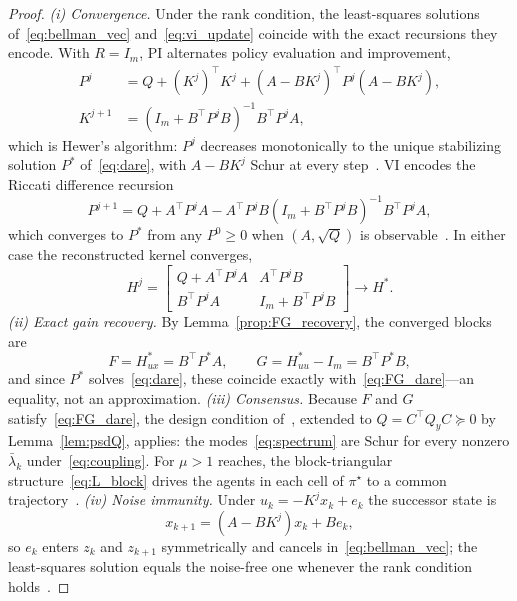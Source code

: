 \documentclass[final,5p,times]{elsarticle}
\theoremstyle{plain}
\theoremstyle{definition}
\theoremstyle{remark}
\begin{document}
\begin{proof}
\emph{(i) Convergence.} Under the rank condition, the least-squares solutions of~\eqref{eq:bellman_vec} and~\eqref{eq:vi_update} coincide with the exact recursions they encode. With $R = I_m$, PI alternates policy evaluation and improvement,
\begin{align}
P^j &= Q + (K^j)^\top K^j + (A - BK^j)^\top P^j (A - BK^j), \label{eq:pi_eval}\\
K^{j+1} &= (I_m + B^\top P^j B)^{-1} B^\top P^j A, \label{eq:pi_improve}
\end{align}
which is Hewer's algorithm: $P^j$ decreases monotonically to the unique stabilizing solution $P^*$ of~\eqref{eq:dare}, with $A - BK^j$ Schur at every step~\cite{hewer1971}. VI encodes the Riccati difference recursion
\begin{equation}
P^{j+1} = Q + A^\top\! P^j A - A^\top\! P^j B (I_m + B^\top\! P^j B)^{-1} B^\top\! P^j A,
\label{eq:vi_riccati}
\end{equation}
which converges to $P^*$ from any $P^0 \geq 0$ when $(A, \sqrt{Q})$ is observable~\cite{lewis2009,rizvi2022}. In either case the reconstructed kernel converges,
\begin{equation}
H^j = \begin{bmatrix} Q + A^\top\! P^j A & A^\top\! P^j B\\ B^\top\! P^j A & I_m + B^\top\! P^j B\end{bmatrix} \longrightarrow H^*.
\end{equation}
\emph{(ii) Exact gain recovery.} By Lemma~\ref{prop:FG_recovery}, the converged blocks are
\begin{equation}
F = H_{ux}^* = B^\top\! P^* A, \qquad G = H_{uu}^* - I_m = B^\top\! P^* B,
\end{equation}
and since $P^*$ solves~\eqref{eq:dare}, these coincide exactly with~\eqref{eq:FG_dare}---an equality, not an approximation.
\emph{(iii) Consensus.} Because $F$ and $G$ satisfy~\eqref{eq:FG_dare}, the design condition of~\cite[Thm.~3.1]{cacace2024}, extended to $Q = C^\top Q_y C \succeq 0$ by Lemma~\ref{lem:psdQ}, applies: the modes~\eqref{eq:spectrum} are Schur for every nonzero $\bar{\lambda}_k$ under~\eqref{eq:coupling}. For $\mu > 1$ reaches, the block-triangular structure~\eqref{eq:L_block} drives the agents in each cell of $\pi^\star$ to a common trajectory~\cite[Thm.~4.1]{cacace2024}.
\emph{(iv) Noise immunity.} Under $u_k = -K^j x_k + e_k$ the successor state is
\begin{equation}
x_{k+1} = (A - BK^j)x_k + B e_k,
\end{equation}
so $e_k$ enters $z_k$ and $z_{k+1}$ symmetrically and cancels in~\eqref{eq:bellman_vec}; the least-squares solution equals the noise-free one whenever the rank condition holds~\cite{bradtke1994,rizvi2022}.
\end{proof}
\end{document}
